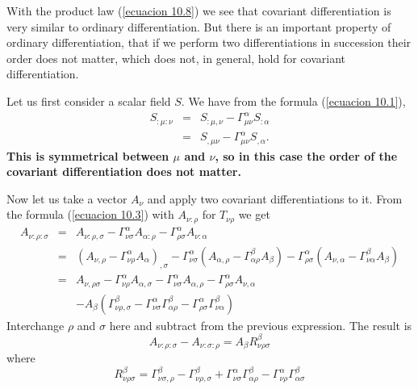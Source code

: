 With the product law (\ref{ecuacion 10.8}) we see that covariant 
differentiation is very similar to ordinary differentiation. But there is an 
important property of ordinary differentiation, that if we perform two 
differentiations in succession their order does not matter, which does not, in 
general, hold for covariant differentiation.

Let us first consider a scalar field $S$. We have from the formula 
(\ref{ecuacion 10.1}),
\begin{equation}
 \label{ecuacion 11.1}
 \begin{array}{rcl}
 S_{:\mu:\nu} & = & S_{:\mu,\nu} - \Gamma^{\alpha}_{\mu\nu} S_{:\alpha} \\
      & = & S_{,\mu\nu} - \Gamma^{\alpha}_{\mu\nu} S_{,\alpha}.
 \end{array}
\end{equation}
\textbf{This is symmetrical between $\mu$ and $\nu$, so in this 
case the order of the covariant differentiation does not matter.}

Now let us take a vector $A_{\nu}$ and apply two covariant differentiations to 
it. From the formula (\ref{ecuacion 10.3}) with $A_{\nu:\rho}$ for 
$T_{\nu\rho}$ we get
\[
 \begin{array}{rcl}
  A_{\nu:\rho:\sigma} & = & A_{\nu:\rho,\sigma} 
  - \Gamma^{\alpha}_{\nu\sigma} A_{\alpha:\rho}
  - \Gamma^{\alpha}_{\rho\sigma} A_{\nu:\alpha} \\
  & = &  \left(A_{\nu,\rho} - 
              \Gamma^{\alpha}_{\nu\rho} A_{\alpha} \right)_{,\sigma}
  - \Gamma^{\alpha}_{\nu\sigma} \left( 
      A_{\alpha,\rho} - \Gamma^{\beta}_{\alpha\rho} A_{\beta}
  \right)
  - \Gamma^{\alpha}_{\rho\sigma}  \left( 
      A_{\nu,\alpha} - \Gamma^{\beta}_{\nu\alpha} A_{\beta}
  \right)\\
  & = & A_{\nu,\rho\sigma} 
      - \Gamma^{\alpha}_{\nu\rho} A_{\alpha,\sigma}
      - \Gamma^{\alpha}_{\nu\sigma} A_{\alpha,\rho}
      - \Gamma^{\alpha}_{\rho\sigma} A_{\nu,\alpha}\\
      & & 
      -A_{\beta}\left(
        \Gamma^{\beta}_{\nu\rho,\sigma}
      - \Gamma^{\alpha}_{\nu\sigma}\Gamma^{\beta}_{\alpha\rho}
      - \Gamma^{\alpha}_{\rho\sigma}\Gamma^{\beta}_{\nu\alpha}
      \right)
 \end{array}
\]
Interchange $\rho$ and $\sigma$ here and subtract from the previous expression. 
The result is
\begin{equation}
 \label{ecuacion 11.2}
 A_{\nu:\rho:\sigma} - A_{\nu:\sigma:\rho} =
 A_{\beta}R^{\beta}_{\nu\rho\sigma}
\end{equation}
where
\begin{equation}
 \label{ecuacion 11.3}
 R^{\beta}_{\nu\rho\sigma} = 
 \Gamma^{\beta}_{\nu\sigma,\rho} - \Gamma^{\beta}_{\nu\rho,\sigma}
 + \Gamma^{\alpha}_{\nu\sigma}\Gamma^{\beta}_{\alpha\rho}
 - \Gamma^{\alpha}_{\nu\rho}\Gamma^{\beta}_{\alpha\sigma}
\end{equation}

